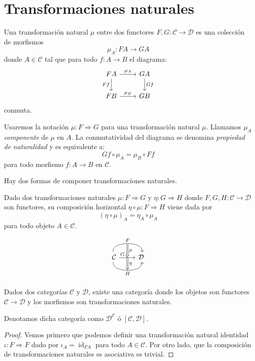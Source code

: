 \documentclass[12pt, twoside]{book}
\newcommand{\newterm}[1]{\index{#1}\emph{#1}}
\newcommand{\cat}{{\mathcal{C}}}
\DeclareMathOperator{\id}{id}
\begin{document}
\section{Transformaciones naturales}
\begin{definition}
Una transformación natural $\mu$ entre dos functores $F, G \colon \cat \to \mathcal{D}$ es una colección de morfismos
\[ \mu_A \colon F A \to G A \]
donde $A \in \cat$ tal que para todo $f \colon A \to B$ el diagrama:
\[
\begin{tikzcd}
F A \arrow[r,"\mu_A"] \arrow[d,"F f" left] & G A \arrow[d,"G f"]\\
F B \arrow[r,"\mu_B"] & G B
\end{tikzcd}
\]
conmuta.
\end{definition}

Usaremos la notación $\mu \colon F \Rightarrow G$ para una transformación natural $\mu$.
Llamamos $\mu_A$ \newterm{componente} de $\mu$ en $A$.
La conmutatividad del diagrama se denomina \emph{propiedad de naturalidad} y es equivalente a:
\[ G f \circ \mu_A = \mu_B \circ F f \]
para todo morfismo $f \colon A \to B$ en $\cat$.

Hay dos formas de componer transformaciones naturales.
\begin{definition}
Dado dos transformaciones naturales $\mu \colon F \Rightarrow G$ y $\eta \colon G \Rightarrow H$ donde $F,G,H \colon \cat \to \mathcal{D}$ son functores, su composición horizontal $\eta \circ \mu \colon F \Rightarrow H$ viene dada por
\[ (\eta \circ \mu)_A = \eta_A \circ \mu_A \]
para todo objeto $A \in \cat$.
\end{definition}
\[ \begin{tikzcd}{\cat} \arrow[r,"F", bend left=100, ""{name=U}] \arrow[r,"G", pos=0.2,""{name=M, pos=0.5,below},""{name=M', pos=0.5,above}] \arrow[r,"H" below, bend right=100, ""{name=D, below}] & \mathcal{D}\\
\arrow[Rightarrow, from=U, to=M, "\mu"] \arrow[Rightarrow, from=M', to=D, "\eta"]\end{tikzcd}\]

\begin{lemma}\label{functor-categoria}
Dados dos categorías $\cat$ y $\mathcal{D}$, existe una categoría donde los objetos son functores $\cat \to \mathcal{D}$ y los morfismos son transformaciones naturales.

Denotamos dicha categoría como $\mathcal{D}^\cat$ ó $[\cat,\mathcal{D}]$.
\end{lemma}
\begin{proof}
Vemos primero que podemos definir una transformación natural identidad $\iota \colon F \Rightarrow F$ dado por $\iota_A = \id_{F A}$ para todo $A \in \cat$.
Por otro lado, que la composición de transformaciones naturales es asociativa es trivial.
\end{proof}
\end{document}
